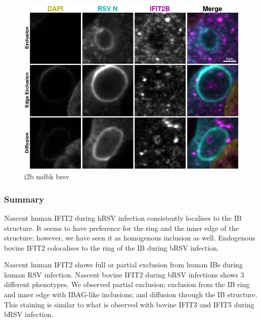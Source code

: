 \begin{figure}
    \centering
    \includegraphics[width=1\linewidth]{10. Chapter 5/Figs/01. Infection/02. IFIT2B/12. i2b mdbk brsv.pdf}
    \caption[i2b mdbk brsv]{i2b mdbk brsv}
    \label{fig:i2b mdbk brsv}
\end{figure}

\subsubsection{Summary} \label{Summary-i2-infection}
Nascent human IFIT2 during hRSV infection consistently localises to the IB structure. It seems to have preference for the ring and the inner edge of the structure; however, we have seen it as homogenous inclusion as well. Endogenous bovine IFIT2 colocalises to the ring of the IB during bRSV infection.

Nascent human IFIT2 shows full or partial exclusion from human IBs during human RSV infection. Nascent bovine IFIT2 during bRSV infections shows 3 different phenotypes. We observed partial exclusion; exclusion from the IB ring and inner edge with IBAG-like inclusions; and diffusion through the IB structure. This staining is similar to what is observed with bovine IFIT3 and IFIT5 during bRSV infection.